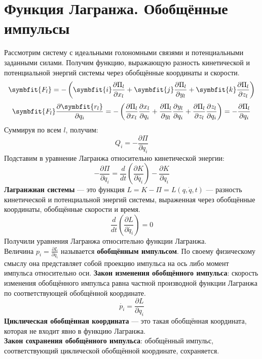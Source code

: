 \documentclass[fleqn,a4paper,12pt,titlepage,finall]{article}
\newcommand\vv[1]{\symbfit{#1}}
\begin{document}
\section{Функция Лагранжа. Обобщённые импульсы}
Рассмотрим систему с идеальными голономными связями и потенциальными заданными
силами. Получим функцию, выражающую разность кинетической и потенциальной
энергий системы через обобщённые координаты и скорости.
\[\vv{F_l} = -\left(\vv{i}\frac{\partial\Pi_l}{\partial x_l} +
\vv{j}\frac{\partial\Pi_l}{\partial y_l} +
\vv{k}\frac{\partial\Pi_l}{\partial z_l}\right)\]
\[\vv{F_l}\frac{\partial\vv{r_l}}{\partial q_i} = -\left(
\frac{\partial\Pi_l}{\partial x_l} \frac{\partial x_l}{\partial q_i} +
\frac{\partial\Pi_l}{\partial y_l} \frac{\partial y_l}{\partial q_i} +
\frac{\partial\Pi_l}{\partial z_l} \frac{\partial z_l}{\partial q_i}\right) =
-\frac{\partial\Pi_l}{\partial q_i}\]
Суммируя по всем $l$, получим:
\[Q_i = -\frac{\partial \Pi}{\partial q_i}\]
Подставим в уравнение Лагранжа относительно кинетической энергии:
\[-\frac{\partial \Pi}{\partial q_i} = \frac{d}{dt}\left(\frac{\partial
K}{\partial \dot{q_i}}\right) - \frac{\partial K}{\partial q_i}\]
{\bf Лагранжиан системы} --- это функция $L=K-\Pi = L(q, \dot{q}, t)$
--- разность кинетической и потенциальной энергий системы, выраженная через
обобщённые координаты, обобщённые скорости и время.
\[\boxed{\frac{d}{dt}\left(\frac{\partial L}{\partial\dot{q_i}}\right) = 0}\]
Получили уравнения Лагранжа относительно функции Лагранжа. \\
Величина $p_i = \frac{\partial L}{\partial\dot{q_i}}$ называется {\bf обобщённым
импульсом}. По своему физическому смыслу она представляет собой проекцию
импульса на ось либо момент импульса относительно оси.
{\bf Закон изменения обобщённого импульса}: скорость изменения обобщённого
импульса равна частной производной функции Лагранжа по соответствующей
обобщённой координате.
\[\dot{p_i} = \frac{\partial L}{\partial q_i}\]
{\bf Циклическая обобщённая координата} --- это такая обобщённая координата,
которая не входит явно в функцию Лагранжа. \\
{\bf Закон сохранения обобщённого импульса}: обобщённый импульс, соответствующий
циклической обобщённой координате, сохраняется.
\end{document}
